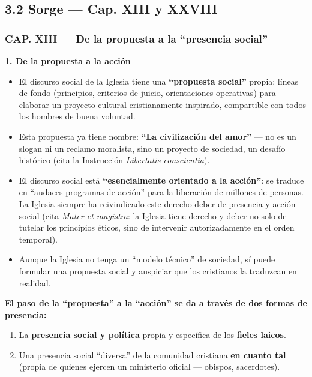 \documentclass[10pt,a4paper]{article}
\begin{document}
\subsection{3.2 Sorge --- Cap. XIII y XXVIII}

\subsubsection{CAP. XIII --- De la propuesta a la ``presencia social''}

\medskip\noindent \textbf{1. De la propuesta a la acción}\par\nopagebreak
\begin{itemize}
\item El discurso social de la Iglesia tiene una \textbf{``propuesta social''} propia: líneas de fondo (principios, criterios de juicio, orientaciones operativas) para elaborar un proyecto cultural cristianamente inspirado, compartible con todos los hombres de buena voluntad.
\item Esta propuesta ya tiene nombre: \textbf{``La civilización del amor''} --- no es un slogan ni un reclamo moralista, sino un proyecto de sociedad, un desafío histórico (cita la Instrucción \textit{Libertatis conscientia}).
\item El discurso social está \textbf{``esencialmente orientado a la acción''}: se traduce en ``audaces programas de acción'' para la liberación de millones de personas. La Iglesia siempre ha reivindicado este derecho-deber de presencia y acción social (cita \textit{Mater et magistra}: la Iglesia tiene derecho y deber no solo de tutelar los principios éticos, sino de intervenir autorizadamente en el orden temporal).
\item Aunque la Iglesia no tenga un ``modelo técnico'' de sociedad, sí puede formular una propuesta social y auspiciar que los cristianos la traduzcan en realidad.
\end{itemize}

\medskip\noindent \textbf{El paso de la ``propuesta'' a la ``acción'' se da a través de dos formas de presencia:}\par\nopagebreak
\begin{enumerate}
\item La \textbf{presencia social y política} propia y específica de los \textbf{fieles laicos}.
\item Una presencia social ``diversa'' de la comunidad cristiana \textbf{en cuanto tal} (propia de quienes ejercen un ministerio oficial --- obispos, sacerdotes).
\end{enumerate}
\end{document}
